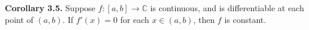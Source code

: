\textbf{Corollary 3.5.} Suppose $f: [a, b] \to \mathbb{C}$ is continuous, and is differentiable at each point of $(a, b)$. If $f'(x) = 0$ for each $x \in (a, b)$, then $f$ is constant.
